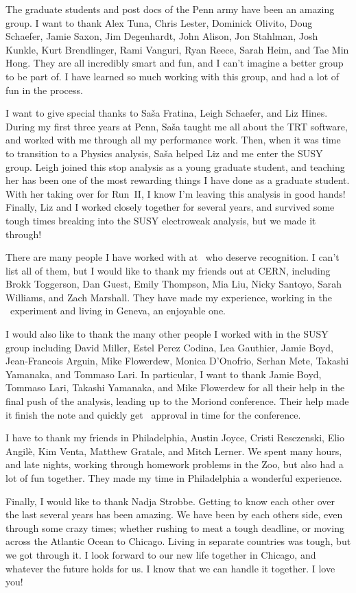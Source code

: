 The graduate students and post docs of the Penn army have been an amazing
group.
I want to thank
Alex Tuna,
Chris Lester,
Dominick Olivito,
Doug Schaefer,
Jamie Saxon,
Jim Degenhardt,
John Alison,
Jon Stahlman,
Josh Kunkle,
Kurt Brendlinger,
Rami Vanguri,
Ryan Reece,
Sarah Heim,
and Tae Min Hong.
They are all incredibly smart and fun, and I can't imagine a better group to be
part of.
I have learned so much working with this group, and had a lot of fun in the
process.

I want to give special thanks to Sa\v{s}a Fratina, Leigh Schaefer, and Liz
Hines.
During my first three years at Penn, Sa\v{s}a taught me all about the TRT
software, and worked with me through all my performance work.
Then, when it was time to transition to a Physics analysis, Sa\v{s}a helped Liz
and me enter the SUSY group.
Leigh joined this stop analysis as a young graduate student, and teaching her
has been one of the most rewarding things I have done as a graduate student.
With her taking over for Run~II, I know I'm leaving this analysis in good
hands!
Finally, Liz and I worked closely together for several years, and survived some
tough times breaking into the SUSY electroweak analysis, but we made it
through!

There are many people I have worked with at \atlas\ who deserve recognition.
I can't list all of them, but I would like to thank my friends out at CERN,
including
Brokk Toggerson,
Dan Guest,
Emily Thompson,
Mia Liu,
Nicky Santoyo,
Sarah Williams,
and Zach Marshall.
They have made my experience, working in the \atlas\ experiment and living in
Geneva, an enjoyable one.

I would also like to thank the many other people I worked with in the SUSY
group including
David Miller,
Estel Perez Codina,
Lea Gauthier,
Jamie Boyd,
Jean-Francois Arguin,
Mike Flowerdew,
Monica D'Onofrio,
Serhan Mete,
Takashi Yamanaka,
and Tommaso Lari.
In particular, I want to thank Jamie Boyd, Tommaso Lari, Takashi Yamanaka, and
Mike Flowerdew for all their help in the final push of the analysis, leading up
to the Moriond conference.
Their help made it finish the note and quickly get \atlas\ approval in time
for the conference.

I have to thank my friends in Philadelphia,
Austin Joyce,
Cristi Resczenski,
Elio Angil\`{e},
Kim Venta,
Matthew Gratale,
and Mitch Lerner.
We spent many hours, and late nights, working through homework problems in the
Zoo, but also had a lot of fun together.
They made my time in Philadelphia a wonderful experience.

Finally, I would like to thank Nadja Strobbe.
Getting to know each other over the last several years has been amazing.
We have been by each others side, even through some crazy times; whether
rushing to meat a tough deadline, or moving across the Atlantic Ocean to
Chicago.
Living in separate countries was tough, but we got through it.
I look forward to our new life together in Chicago, and whatever the future
holds for us.
I know that we can handle it together.
I love you!

